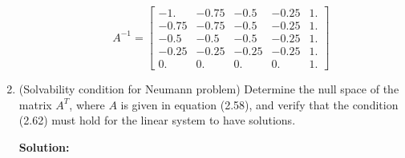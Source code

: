 \documentclass[letterpaper,12pt]{article}
\begin{document}
\begin{enumerate}
\begin{enumerate}
\[A^{-1} = 
\begin{bmatrix}  -1. & -0.75 & -0.5 & -0.25 & 1.\\  -0.75 & -0.75 & -0.5 & -0.25 & 1.\\  -0.5 & -0.5 & -0.5 & -0.25 & 1.\\  -0.25 & -0.25 & -0.25 & -0.25 & 1.\\ 0. & 0. & 0. & 0. & 1.  \end{bmatrix}
\]

\end{enumerate}


\item (Solvability condition for Neumann problem)
Determine the null space of the matrix $A^T$, where $A$ is given in
equation (2.58), and verify that the condition (2.62) must hold for the
linear system to have solutions.

{\bf Solution:}



\end{enumerate}
\end{document}
